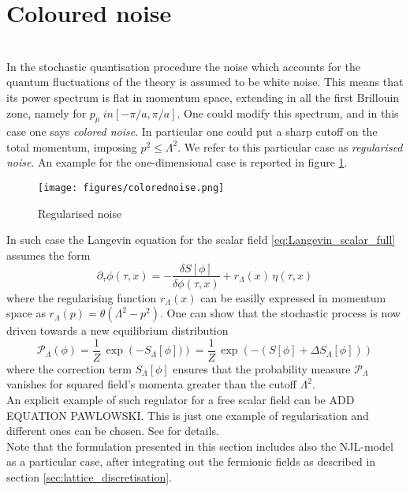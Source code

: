 \section{Coloured noise}
\label{sec:coloured_noise}
 \\
In the stochastic quantisation procedure the noise which accounts for the quantum fluctuations of the theory is assumed to be white noise. This means that its power spectrum is flat in momentum space, extending in all the first Brillouin zone, namely for $p_\mu \ in [-\pi/a, \pi/a]$. One could modify this spectrum, and in this case one says \emph{colored noise}. In particular one could put a sharp cutoff on the total momentum, imposing $p^2 \leq \Lambda^2$. We refer to this particular case as \emph{regularised noise}. An example for the one-dimensional case is reported in figure \ref{fig:white_noise_colored_noise}.
\begin{figure}
    \centering
    \texttt{[image: figures/colorednoise.png]}
    \caption{Regularised noise}
    \label{fig:white_noise_colored_noise}
\end{figure}
In such case the Langevin equation for the scalar field \eqref{eq:Langevin_scalar_full} assumes the form
\begin{equation*}
    \partial_\tau \phi(\tau, x) = - \frac{\delta S[\phi]}{\delta \phi (\tau, x)} + r_\Lambda (x) \, \eta (\tau, x)
    \label{eq:Langevin_scalar_regularised}
\end{equation*}
where the regularising function $r_\Lambda(x)$ can be easilly expressed in momentum space as $r_\Lambda(p) = \theta(\Lambda^2 - p^2)$. One can show \cite{Pawlowski2017CoolingNoise} that the stochastic process is now driven towards a new equilibrium distribution
\begin{equation}
    \mathcal{P}_\Lambda(\phi) = \frac{1}{Z} \, \exp\left(-S_\Lambda[\phi])\right) = \frac{1}{Z} \, \exp\left(-(S[\phi] + \Delta S_\Lambda[\phi])\right)
    \label{eq:probability_field_configuration_regularised}
\end{equation}
where the correction term $S_\Lambda[\phi]$ ensures that the probability measure $\mathcal{P}_\Lambda$ vanishes for squared field's momenta greater than the cutoff $\Lambda^2$. \\
An explicit example of such regulator for a free scalar field can be ADD EQUATION PAWLOWSKI.
This is just one example of regularisation and different ones can be chosen. See \cite{Pawlowski2017CoolingNoise} for details. \\
Note that the formulation presented in this section includes also the NJL-model as a particular case, after integrating out the fermionic fields as described in section \ref{sec:lattice_discretisation}.


